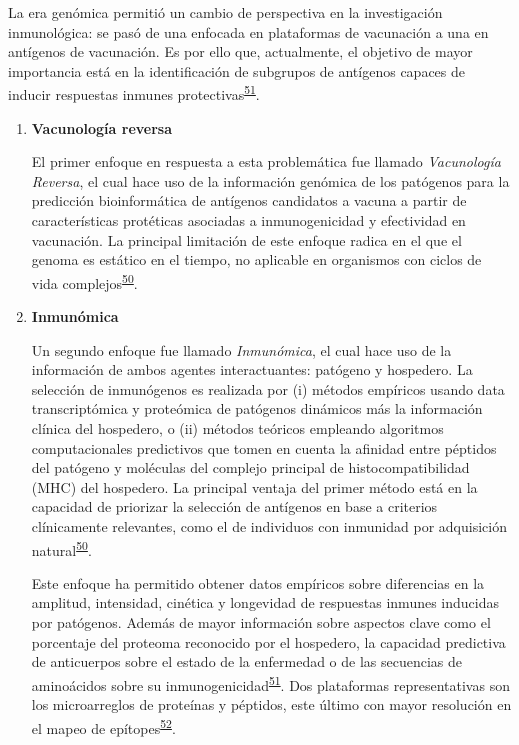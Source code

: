 \documentclass[]{article}
\begin{document}
\begin{enumerate}
  La era genómica permitió un cambio de perspectiva en la investigación
  inmunológica: se pasó de una enfocada en plataformas de vacunación a
  una en antígenos de vacunación. Es por ello que, actualmente, el
  objetivo de mayor importancia está en la identificación de subgrupos
  de antígenos capaces de inducir respuestas inmunes
  protectivas\textsuperscript{\protect\hyperlink{ref-Davies2015Large}{51}}.

  \begin{enumerate}
  \def\labelenumii{\roman{enumii}.}
  \item
    \textbf{Vacunología reversa}

    El primer enfoque en respuesta a esta problemática fue llamado
    \emph{Vacunología Reversa}, el cual hace uso de la información
    genómica de los patógenos para la predicción bioinformática de
    antígenos candidatos a vacuna a partir de características protéticas
    asociadas a inmunogenicidad y efectividad en vacunación. La
    principal limitación de este enfoque radica en el que el genoma es
    estático en el tiempo, no aplicable en organismos con ciclos de vida
    complejos\textsuperscript{\protect\hyperlink{ref-immunomics2016}{50}}.
  \item
    \textbf{Inmunómica}

    Un segundo enfoque fue llamado \emph{Inmunómica}, el cual hace uso
    de la información de ambos agentes interactuantes: patógeno y
    hospedero. La selección de inmunógenos es realizada por (i) métodos
    empíricos usando data transcriptómica y proteómica de patógenos
    dinámicos más la información clínica del hospedero, o (ii) métodos
    teóricos empleando algoritmos computacionales predictivos que tomen
    en cuenta la afinidad entre péptidos del patógeno y moléculas del
    complejo principal de histocompatibilidad (MHC) del hospedero. La
    principal ventaja del primer método está en la capacidad de
    priorizar la selección de antígenos en base a criterios clínicamente
    relevantes, como el de individuos con inmunidad por adquisición
    natural\textsuperscript{\protect\hyperlink{ref-immunomics2016}{50}}.

    Este enfoque ha permitido obtener datos empíricos sobre diferencias
    en la amplitud, intensidad, cinética y longevidad de respuestas
    inmunes inducidas por patógenos. Además de mayor información sobre
    aspectos clave como el porcentaje del proteoma reconocido por el
    hospedero, la capacidad predictiva de anticuerpos sobre el estado de
    la enfermedad o de las secuencias de aminoácidos sobre su
    inmunogenicidad\textsuperscript{\protect\hyperlink{ref-Davies2015Large}{51}}.
    Dos plataformas representativas son los microarreglos de proteínas y
    péptidos, este último con mayor resolución en el mapeo de
    epítopes\textsuperscript{\protect\hyperlink{ref-carmona2015peptide}{52}}.
  \end{enumerate}
\end{enumerate}
\end{document}
